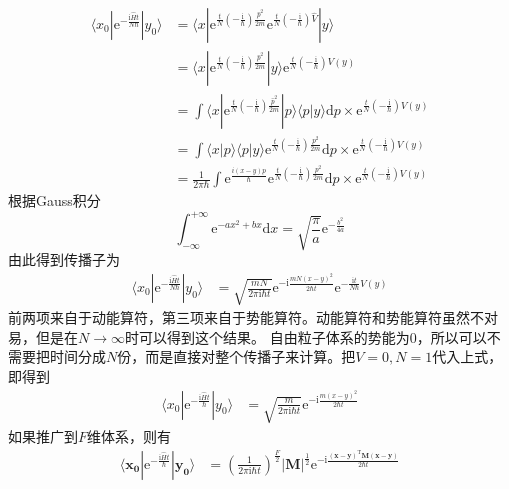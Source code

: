         \begin{align*}
            \langle x_0 | \mathrm{e}^{-\frac {\mathrm{i}\hat{H}t}{N\hbar}} | y_0 \rangle &= \langle x | \mathrm{e}^{\frac tN (-\frac {\mathrm{i}}{\hbar}) \frac {\hat{p}^2}{2m}}
            \mathrm{e}^{\frac tN (-\frac {\mathrm{i}}{\hbar}) \hat{V}} |y \rangle\\
            &= \langle x | \mathrm{e}^{\frac tN (-\frac {\mathrm{i}}{\hbar}) \frac {\hat{p}^2}{2m}} |y \rangle \mathrm{e}^{\frac tN (-\frac {\mathrm{i}}{\hbar}) V(y)}\\
            &= \int \langle x | \mathrm{e}^{\frac tN (-\frac {\mathrm{i}}{\hbar}) \frac {\hat{p}^2}{2m}} |p \rangle \langle p |y \rangle \mathrm{d}p \times \mathrm{e}^{\frac tN (-\frac {\mathrm{i}}{\hbar}) V(y)}\\
            &= \int \langle x|p \rangle \langle p|y \rangle \mathrm{e}^{\frac tN (-\frac {\mathrm{i}}{\hbar}) \frac {p^2}{2m}} \mathrm{d}p \times \mathrm{e}^{\frac tN (-\frac {\mathrm{i}}{\hbar}) V(y)}\\
            &= \frac 1{2\pi \hbar} \int \mathrm{e}^{\frac {i(x-y)p}{\hbar}} \mathrm{e}^{\frac tN (-\frac {\mathrm{i}}{\hbar}) \frac {p^2}{2m}} \mathrm{d}p \times \mathrm{e}^{\frac tN (-\frac {\mathrm{i}}{\hbar}) V(y)}
        \end{align*}
        根据Gauss积分
        \begin{equation*}
            \int_{-\infty}^{+\infty} \mathrm{e}^{-ax^2+bx} \mathrm{d}x = \sqrt{\frac {\pi}a} \mathrm{e}^{-\frac {b^2}{4a}}
        \end{equation*}
        由此得到传播子为
        \begin{align*}
            \langle x_0 | \mathrm{e}^{-\frac {\mathrm{i}\hat{H}t}{N\hbar}} | y_0 \rangle &= \sqrt{\frac {mN}{2\pi\mathrm{i} \hbar t}} \mathrm{e}^{-\mathrm{i}\frac {mN(x-y)^2}{2\hbar t}}\mathrm{e}^{-\frac {\mathrm{i}t}{N\hbar} V(y)}
        \end{align*}
        前两项来自于动能算符，第三项来自于势能算符。动能算符和势能算符虽然不对易，但是在$N \to \infty$时可以得到这个结果。
        自由粒子体系的势能为0，所以可以不需要把时间分成$N$份，而是直接对整个传播子来计算。把$V=0,N=1$代入上式，即得到
        \begin{align*}
            \langle x_0 | \mathrm{e}^{-\frac {\mathrm{i}\hat{H}t}{\hbar}} |y_0 \rangle &= \sqrt{\frac {m}{2\pi\mathrm{i} \hbar t}} \mathrm{e}^{-\mathrm{i}\frac {m(x-y)^2}{2\hbar t}}
        \end{align*}
        如果推广到$F$维体系，则有
        \begin{align*}
            \langle \bm{x_0} | \mathrm{e}^{-\frac {\mathrm{i}\hat{H}t}{\hbar}} |\bm{y_0} \rangle &= (\frac {1}{2\pi\mathrm{i} \hbar t})^{\frac F2} |\bm{M}|^{\frac 12} \mathrm{e}^{-\mathrm{i}\frac {\bm{(x-y)}^{\mathrm{T}} \bm{M (x-y)}}{2\hbar t}}
        \end{align*}

